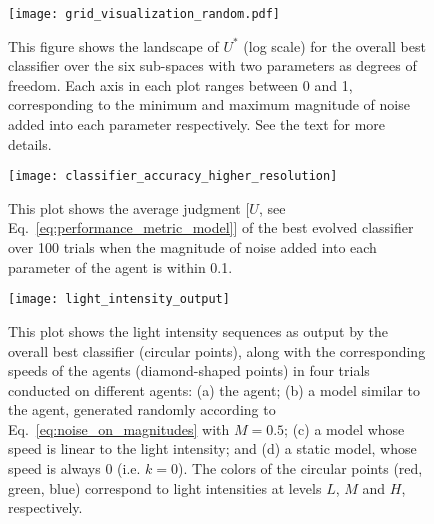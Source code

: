 \begin{figure}[!t]
	\centering
			\texttt{[image: grid\_visualization\_random.pdf]}
		\caption{This figure shows the landscape of $U^{*}$ (log scale) for the overall best classifier over the six sub-spaces with two parameters as degrees of freedom. Each axis in each plot ranges between 0 and 1, corresponding to the minimum and maximum magnitude of noise added into each parameter respectively. See the text for more details.\label{fig:grid_search}}
\end{figure}

\begin{figure}[!t]
		\centering
		\texttt{[image: classifier\_accuracy\_higher\_resolution]}
		\caption{This plot shows the average judgment [$U$, see Eq.~\ref{eq:performance_metric_model}] of the best evolved classifier over 100 trials when the magnitude of noise added into each parameter of the agent is within 0.1.\label{fig:classifier_accuracy_higher_resolution}}
\end{figure}

\begin{figure*}[!t]
	\centering
			\texttt{[image: light\_intensity\_output]}
			\caption{This plot shows the light intensity sequences as output by the overall best classifier (circular points), along with the corresponding speeds of the agents (diamond-shaped points) in four trials conducted on different agents: (a) the agent; (b) a model similar to the agent, generated randomly according to Eq.~\ref{eq:noise_on_magnitudes} with $M=0.5$; (c) a model whose speed is linear to the light intensity; and (d) a static model, whose speed is always $0$ (i.e. $k=0$).
The colors of the circular points (red, green, blue) correspond to light intensities at levels $L$, $M$ and $H$, respectively.\label{fig:post_evaluation_light_output}}
\end{figure*}

